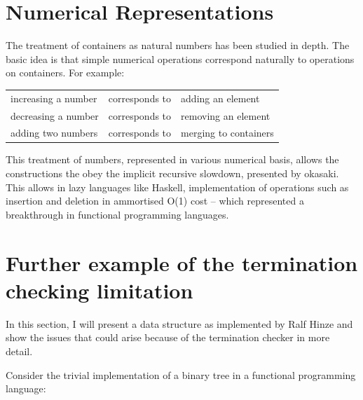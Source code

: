 \documentclass[12pt,twoside,notitlepage]{report}
\begin{document}
\section{Numerical Representations}
\label{app:numrep}
The treatment of containers as natural numbers has been studied in depth\cite{okasaki}. The basic idea is that simple numerical operations correspond naturally to operations on containers. For example:

\vspace{5mm} %
\begin{tabular}{lcl}
increasing a number & corresponds to & adding an element\\
decreasing a number & corresponds to & removing an element \\
adding two numbers & corresponds to & merging to containers \\
\end{tabular} 
\vspace{5mm}

This treatment of numbers, represented in various numerical basis, allows the constructions the obey the implicit recursive slowdown, presented by okasaki. This allows in lazy languages like Haskell, implementation of operations such as insertion and deletion in ammortised O(1) cost -- which represented a breakthrough in functional programming languages.

\section{Further example of the termination checking limitation}
\label{app:termcheck}
In this section, I will present a data structure as implemented by Ralf Hinze\cite{nestedhinze} and show the issues that could arise because of the termination checker in more detail. 

Consider the trivial implementation of a binary tree in a functional programming language:

\begin{code}
\\
\>[2]\<[4]%
\>[4]  \AgdaSymbol{(} \AgdaSymbol{:} \AgdaSymbol{)} \AgdaSymbol{:}  \<%
\\
\>[4]\<[6]%
\>[6] \AgdaSymbol{:}    \<%
\\
\>[4]\<[6]%
\>[6] \AgdaSymbol{:}        \<%
\\
\end{code}
\end{document}
